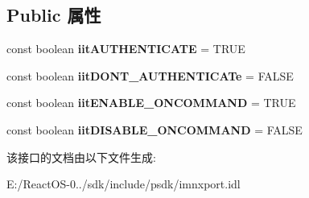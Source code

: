 \subsection*{Public 属性}
\begin{DoxyCompactItemize}
\item 
\mbox{\label{interface_i_internet_transport_a80953888ae9af3aef2cd494b465268a9}} 
const boolean {\bfseries iit\+A\+U\+T\+H\+E\+N\+T\+I\+C\+A\+TE} = T\+R\+UE
\item 
\mbox{\label{interface_i_internet_transport_a9335484fbd44b23d0d677b67d6859d17}} 
const boolean {\bfseries iit\+D\+O\+N\+T\+\_\+\+A\+U\+T\+H\+E\+N\+T\+I\+C\+A\+Te} = F\+A\+L\+SE
\item 
\mbox{\label{interface_i_internet_transport_aafe753e18c133444f5d7310fcaded12b}} 
const boolean {\bfseries iit\+E\+N\+A\+B\+L\+E\+\_\+\+O\+N\+C\+O\+M\+M\+A\+ND} = T\+R\+UE
\item 
\mbox{\label{interface_i_internet_transport_abb2acaa462d689d1a96355a50671d00b}} 
const boolean {\bfseries iit\+D\+I\+S\+A\+B\+L\+E\+\_\+\+O\+N\+C\+O\+M\+M\+A\+ND} = F\+A\+L\+SE
\end{DoxyCompactItemize}


该接口的文档由以下文件生成\+:\begin{DoxyCompactItemize}
\item 
E\+:/\+React\+O\+S-\/0../sdk/include/psdk/imnxport.\+idl\end{DoxyCompactItemize}
